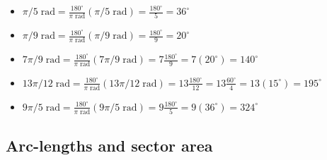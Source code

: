 \documentclass{article}
\begin{document}
\begin{itemize}
\item \(\pi/5\;\text{rad} = \frac{180^\circ}{\pi\;\text{rad}}(\pi/5\;\text{rad}) = \frac{180^\circ}{5} = 36^\circ\)
\item \(\pi/9\;\text{rad} = \frac{180^\circ}{\pi\;\text{rad}}(\pi/9\;\text{rad}) = \frac{180^\circ}{9} = 20^\circ\)
\item \(7\pi/9\;\text{rad} = \frac{180^\circ}{\pi\;\text{rad}}(7\pi/9\;\text{rad}) = 7\frac{180^\circ}{9} = 7(20^\circ) = 140^\circ\)
\item \(13\pi/12\;\text{rad} = \frac{180^\circ}{\pi\;\text{rad}}(13\pi/12\;\text{rad}) = 13\frac{180^\circ}{12} = 13\frac{60^\circ}{4} = 13(15^\circ) = 195^\circ\)
\item \(9\pi/5\;\text{rad} = \frac{180^\circ}{\pi\;\text{rad}}(9\pi/5\;\text{rad}) = 9\frac{180^\circ}{5} = 9(36^\circ) = 324^\circ\)
\end{itemize}




\subsection{Arc-lengths and sector area}
\end{document}

